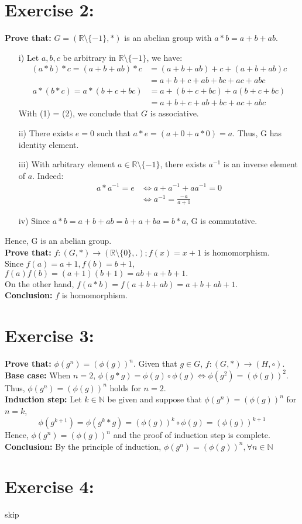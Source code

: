 \documentclass{article}
\newcommand{\N}{\mathbb{N}}
\newcommand{\R}{\mathbb{R}}
\begin{document}
	\section{Exercise 2:}
		\textbf{Prove that:} $G = (\R\setminus\{-1\}, *)$ is an abelian group with $a*b=a+b+ab$.
		\begin{enumerate}
			\item [i)]
				Let $a, b, c$ be arbitrary in $\R\setminus\{-1\}$, we have:
				\begin{align*}
					(a*b)*c = (a+b+ab)*c &= (a+b+ab) + c + (a+b+ab)c \\
									 	 &= a+b+c +ab+bc+ac+abc\tag{1}
				\end{align*}
				\begin{align*}
					a*(b*c) = a*(b+c+bc) &= a + (b+c+bc) + a(b+c+bc) \\
									 	 &= a+b+c +ab+bc+ac+abc\tag{2}
				\end{align*}
				With (1) = (2), we conclude that $G$ is associative.
			\item[ii)]
				There exists $e=0$ such that $a*e = (a+0+a*0) = a$. Thus, G has identity element.
			\item[iii)]
				With arbitrary element $a \in \R\setminus\{-1\}$, there exists $a^{-1}$ is an inverse element of $a$. Indeed:
				\begin{align*}
					a*a^{-1} = e &\iff a+a^{-1}+aa^{-1} = 0\\
								 &\iff a^{-1} = \frac{-a}{a+1}
				\end{align*}
			\item[iv)]
				Since $a*b = a+b+ab = b+a+ba = b*a$, G is commutative.
		\end{enumerate}
		Hence, G is an abelian group.\\
		\textbf{Prove that:} $f: (G, *) \rightarrow (\R\setminus\{0\}, .); f(x) = x + 1$ is homomorphism.\\
		Since $f(a) = a+1, f(b) = b + 1$, $f(a)f(b) = (a+1)(b+1) = ab + a + b + 1.$\\
		On the other hand, $f(a*b) = f(a+b+ab) = a + b + ab + 1$.\\
		\textbf{Conclusion:} $f$ is homomorphism.
		
	\section{Exercise 3:}
		\textbf{Prove that:} $\phi(g^n) = (\phi(g))^n$. Given that $g \in G$, $f:(G, *) \rightarrow (H, \circ)$.\\
		\textbf{Base case:} When $n=2$, $\phi(g*g) = \phi(g)\circ\phi(g) \iff \phi(g^2) = (\phi(g))^2$. Thus, $\phi(g^n) = (\phi(g))^n$ holds for $n = 2$.\\
		\textbf{Induction step:} Let $k \in \N$ be given and suppose that  $\phi(g^n) = (\phi(g))^n$ for $n = k$,
		\begin{equation*}
			\phi(g^{k+1}) = \phi(g^k*g) = (\phi(g))^k\circ\phi(g) = (\phi(g))^{k+1}
		\end{equation*}
		Hence, $\phi(g^n) = (\phi(g))^n$ and the proof of induction step is complete.
		\textbf{Conclusion:} By the principle of induction, $\phi(g^n) = (\phi(g))^n, \forall n \in \N$
	
	\section{Exercise 4:} skip
\end{document}
